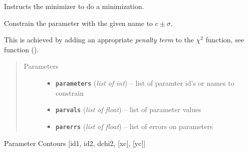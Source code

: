 \documentclass[a4paper,10pt,english]{sphinxmanual}
\begin{document}
\begin{fulllineitems}
\begin{fulllineitems}
\begin{quote}
\begin{description}
\end{description}\end{quote}

\end{fulllineitems}


\begin{fulllineitems}
\label{index:kafe.fit.Fit.call_minimizer}
Instructs the minimizer to do a minimization.

\end{fulllineitems}


\begin{fulllineitems}
\label{index:kafe.fit.Fit.constrain_parameters}
Constrain the parameter with the given name to \(c\pm\sigma\).

This is achieved by adding an appropriate \emph{penalty term} to the
\(\chi^2\) function, see function {\hyperref[index:kafe.fit.chi2]{\emph{}}} ().
\begin{quote}\begin{description}
\item[{Parameters}] \leavevmode\begin{itemize}
\item {} 
\textbf{\texttt{parameters}} (\emph{list of int}) -- list of paramter id's or names to constrain

\item {} 
\textbf{\texttt{parvals}} (\emph{list of float}) -- list of parameter values

\item {} 
\textbf{\texttt{parerrs}} (\emph{list of float}) -- list of errors on parameters

\end{itemize}

\end{description}\end{quote}

\end{fulllineitems}


\begin{fulllineitems}
\label{index:kafe.fit.Fit.contours}
Parameter Contours {[}id1, id2, dchi2, {[}xc{]}, {[}yc{]}{]}


\end{fulllineitems}
\end{fulllineitems}
\end{document}
